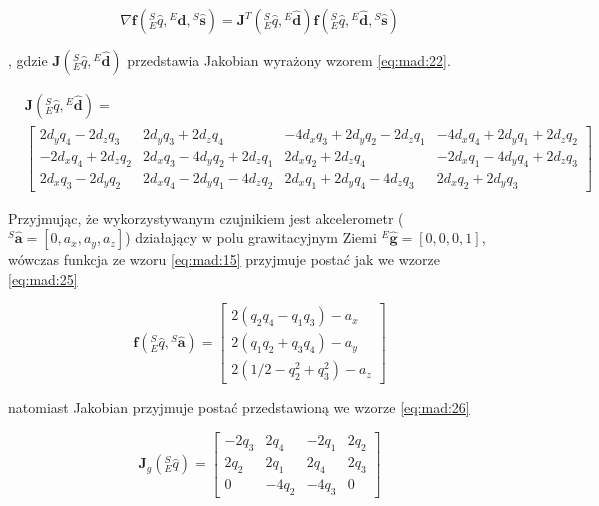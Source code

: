 \begin{equation}
	\nabla \mathbf{f}({^S_E \hat{q}},{^E\hat{\mathbf{d}}} , {^S\hat{\mathbf{s}}}) = \mathbf{J}^T ({^S_E \hat{q}},{^E\hat{\mathbf{d}}})\mathbf{f}({^S_E \hat{q}},{^E\hat{\mathbf{d}}} , {^S\hat{\mathbf{s}}})
	\label{eq:mad:20}
\end{equation}

, gdzie $\mathbf{J}({^S_E \hat{q}},{^E\hat{\mathbf{d}}})$ przedstawia Jakobian wyrażony wzorem \ref{eq:mad:22}.

\begin{equation}
	\begin{split}
		&\mathbf{J}({^S_E \hat{q}},{^E\hat{\mathbf{d}}}) = \\
		&\begin{bmatrix}
		2d_y q_4 - 2d_z q_3  & 2d_y q_3 + 2d_z q_4            & -4d_x q_3 + 2d_y q_2 - 2d_z q_1 & -4d_x q_4 + 2d_y q_1 + 2d_z q_2 \\
		-2d_x q_4 + 2d_z q_2 & 2d_x q_3 - 4d_y q_2 + 2d_z q_1 & 2d_x q_2 + 2d_z q_4             & -2d_x q_1 - 4d_y q_4 + 2d_z q_3 \\
		2d_x q_3 - 2d_y q_2  & 2d_x q_4 - 2d_y q_1 - 4d_z q_2 & 2d_x q_1 + 2d_y q_4 - 4d_z q_3  & 2d_x q_2 + 2d_y q_3             
		\end{bmatrix}
	\end{split}
	\label{eq:mad:22}
\end{equation}

Przyjmując, że wykorzystywanym czujnikiem jest akcelerometr (${^S\hat{\mathbf{a}}} = [0,a_x,a_y,a_z]$) działający w polu grawitacyjnym Ziemi ${^E\hat{\mathbf{g}}} = [0,0,0,1]$, wówczas funkcja ze wzoru \ref{eq:mad:15} przyjmuje postać jak we wzorze \ref{eq:mad:25}

\begin{equation}
	\mathbf{f}({^S_E \hat{q}},{^S\hat{\mathbf{a}}}) = 
	\begin{bmatrix}
		2(q_2 q_4 - q_1 q_3) - a_x   \\
		2(q_1 q_2 + q_3 q_4) - a_y   \\
		2(1/2 - q_2^2 + q_3^2) - a_z 
	\end{bmatrix}
	\label{eq:mad:25}
\end{equation}

natomiast Jakobian przyjmuje postać przedstawioną we wzorze \ref{eq:mad:26}

\begin{equation}
	\mathbf{J}_g({^S_E \hat{q}}) = 
	\begin{bmatrix}
		-2q_3 & 2q_4  & -2q_1 & 2q_2 \\
		2q_2  & 2q_1  & 2q_4  & 2q_3 \\
		0     & -4q_2 & -4q_3 & 0    
	\end{bmatrix}
	\label{eq:mad:26}
\end{equation}

